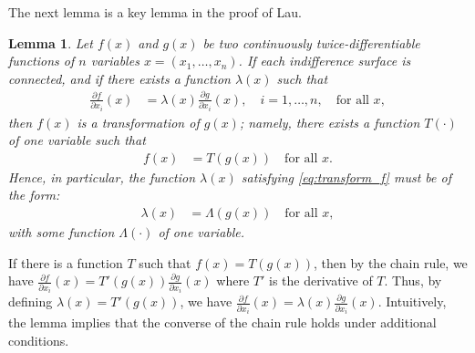 \documentclass[11pt, a4paper]{article}
\newtheorem{lemma}{Lemma}
\theoremstyle{remark}
\begin{document}
The next lemma is a key lemma in the proof of Lau.
\begin{lemma}\label{lemma_1_GU}
    Let $f(x)$ and $g(x)$ be two continuously twice-differentiable functions of $n$ variables $x=(x_1, \dots, x_n)$. If each indifference surface is connected, and if there exists a function $\lambda(x)$ such that
    \begin{align}
    \frac{\partial f}{\partial x_i}(x) &= \lambda(x)\frac{\partial g}{\partial x_i}(x), \quad i=1, \dots, n, \quad \text{for all } x, \label{eq:transform_f}
    \end{align}
    then $f(x)$ is a transformation of $g(x)$; namely, there exists a function $T(\cdot)$ of one variable such that
    \begin{align}
    f(x) &= T(g(x)) \quad \text{for all } x.
    \end{align}
    Hence, in particular, the function $\lambda(x)$ satisfying \eqref{eq:transform_f} must be of the form:
    \begin{align}
        \lambda(x) &= \Lambda(g(x)) \quad \text{for all } x, \label{eq:form_of_lambda}
    \end{align}
    with some function $\Lambda(\cdot)$ of one variable.
\end{lemma}
If there is a function $T$ such that $f(x) = T(g(x))$, then by the chain rule, we have $\frac{\partial f}{\partial x_i}(x) = T'(g(x))\frac{\partial g}{\partial x_i}(x)$ where $T'$ is the derivative of $T$.
Thus, by defining $\lambda(x) = T'(g(x))$, we have $\frac{\partial f}{\partial x_i}(x) = \lambda(x)\frac{\partial g}{\partial x_i}(x)$.
Intuitively, the lemma implies that the converse of the chain rule holds under additional conditions.
\end{document}
